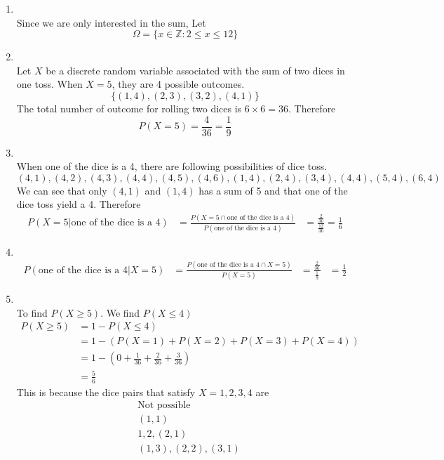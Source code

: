 \documentclass[11pt]{article}
\begin{document}
\begin{enumerate}[label=\alph*]
  \item \\
  Since we are only interested in the sum, Let
  \[
    \Omega = \{ x\in \mathbb{Z}: 2 \leq x\leq 12\}
  \]
  \item \\
  Let $X$ be a discrete random variable associated with the sum of two dices in one toss. When $X=5$, they are 4 possible outcomes.
  \[
    \{ (1,4), (2,3), (3,2), (4,1)\}
  \]
  The total number of outcome for rolling two dices is $6\times 6 = 36$. Therefore $$P(X=5) = \frac{4}{36} = \frac{1}{9}$$
  \item \\
  When one of the dice is a 4, there are following possibilities of dice toss.
  \[
    (4,1), (4,2), (4,3), (4,4), (4,5), (4,6), (1,4), (2,4), (3,4), (4,4), (5,4), (6,4)
  \]
  We can see that only $(4,1)$ and $(1,4)$ has a sum of 5 and that one of the dice toss yield a 4. Therefore
  \begin{align*}
    P(X=5 | \text{one of the dice is a 4})  &= \frac{P(X=5 \cap \text{one of the dice is a 4})}{P(\text{one of the dice is a 4})} &= \frac{\frac{2}{36}}{\frac{12}{36}} = \frac{1}{6}
  \end{align*}
  \item \\
  \begin{align*}
    P(\text{one of the dice is a 4}| X=5) &= \frac{P(\text{one of the dice is a 4} \cap X=5)}{P(X=5)}
    &= \frac{\frac{2}{36}}{\frac{1}{9}}
    &=\frac{1}{2}
  \end{align*}
  \item \\
  To find $P(X\geq 5)$. We find $P(X\leq 4)$
  \begin{align*}
    P(X\geq 5) &= 1-P(X\leq 4) \\
    &= 1- (P(X=1) + P(X=2) + P(X=3) + P(X=4)) \\
    &= 1 - (0+\frac{1}{36} + \frac{2}{36} + \frac{3}{36}) \\
    &= \frac{5}{6}
  \end{align*}
  This is because the dice pairs that satisfy $X=1,2,3,4$ are
  \begin{align*}
    & \text{Not possible} \tag{X=1} \\
    & (1,1) \tag{X=2} \\
    & {1,2}, (2,1) \tag{X=3} \\
    & (1,3), (2,2), (3,1) \tag{X=4}
  \end{align*}
\end{enumerate}
\end{document}
